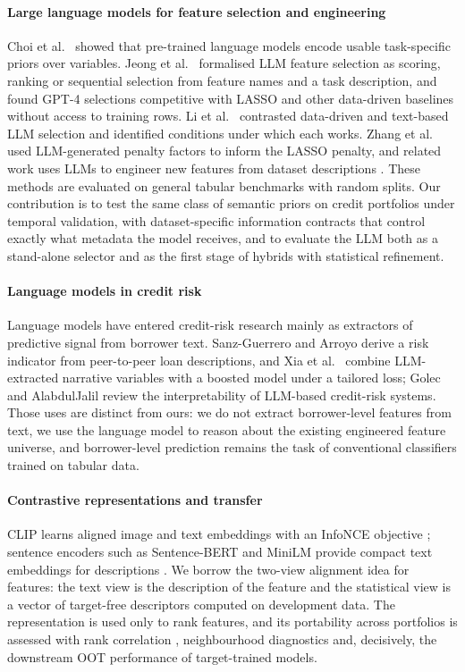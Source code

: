 \documentclass[preprint,12pt]{elsarticle}
\begin{document}
\paragraph{Large language models for feature selection and engineering}
Choi et al.\ \cite{choi2022} showed that pre-trained language models encode usable task-specific priors over variables. Jeong et al.\ \cite{jeong2025} formalised LLM feature selection as scoring, ranking or sequential selection from feature names and a task description, and found GPT-4 selections competitive with LASSO and other data-driven baselines without access to training rows. Li et al.\ \cite{li2025sigkdd} contrasted data-driven and text-based LLM selection and identified conditions under which each works. Zhang et al.\ \cite{zhang2025llmlasso} used LLM-generated penalty factors to inform the LASSO penalty, and related work uses LLMs to engineer new features from dataset descriptions \cite{hollmann2023,han2024}. These methods are evaluated on general tabular benchmarks with random splits. Our contribution is to test the same class of semantic priors on credit portfolios under temporal validation, with dataset-specific information contracts that control exactly what metadata the model receives, and to evaluate the LLM both as a stand-alone selector and as the first stage of hybrids with statistical refinement.

\paragraph{Language models in credit risk}
Language models have entered credit-risk research mainly as extractors of predictive signal from borrower text. Sanz-Guerrero and Arroyo \cite{sanzguerrero2025} derive a risk indicator from peer-to-peer loan descriptions, and Xia et al.\ \cite{xia2025} combine LLM-extracted narrative variables with a boosted model under a tailored loss; Golec and AlabdulJalil \cite{golec2026} review the interpretability of LLM-based credit-risk systems. Those uses are distinct from ours: we do not extract borrower-level features from text, we use the language model to reason about the existing engineered feature universe, and borrower-level prediction remains the task of conventional classifiers trained on tabular data.

\paragraph{Contrastive representations and transfer}
CLIP \cite{radford2021} learns aligned image and text embeddings with an InfoNCE objective \cite{oord2018}; sentence encoders such as Sentence-BERT and MiniLM provide compact text embeddings for descriptions \cite{reimers2019,wang2020minilm}. We borrow the two-view alignment idea for features: the text view is the description of the feature and the statistical view is a vector of target-free descriptors computed on development data. The representation is used only to rank features, and its portability across portfolios is assessed with rank correlation \cite{spearman1904}, neighbourhood diagnostics \cite{venna2001,mcinnes2018} and, decisively, the downstream OOT performance of target-trained models.
\end{document}
